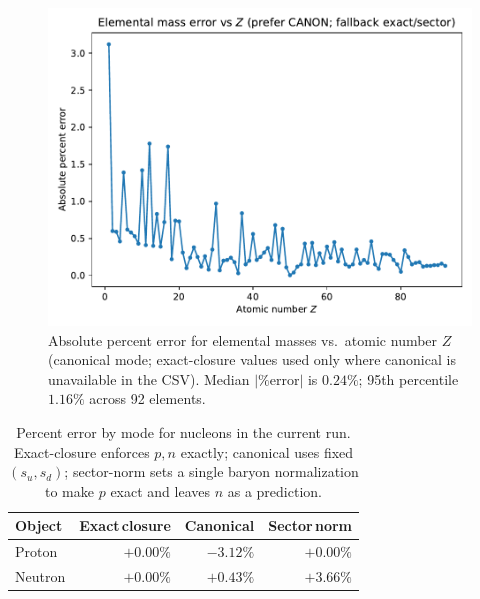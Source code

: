 \documentclass[11pt, preprint,titlepage]{revtex4-2}
\begin{document}
		\begin{figure}[t]
		\centering
		\includegraphics[width=0.75\linewidth]{elements_error_by_Z_canonical.pdf}
		\caption{Absolute percent error for elemental masses vs.\ atomic number \(Z\) (canonical mode; exact-closure values used only where canonical is unavailable in the CSV). Median \(|\%\text{error}|\) is \(0.24\%\); 95th percentile \(1.16\%\) across 92 elements.}
		\label{fig:elements_error_by_Z}
		\end{figure}

		\begin{table}[t]
		\centering
		\begin{tabular}{lrrr}
		\toprule
		\textbf{Object} & \textbf{Exact\,closure} & \textbf{Canonical} & \textbf{Sector\,norm} \\
		\midrule
		Proton  & \(+0.00\%\) & \(-3.12\%\) & \(+0.00\%\) \\
		Neutron & \(+0.00\%\) & \(+0.43\%\) & \(+3.66\%\) \\
		\bottomrule
		\end{tabular}
		\caption{Percent error by mode for nucleons in the current run. Exact-closure enforces \(p,n\) exactly; canonical uses fixed \((s_u,s_d)\); sector-norm sets a single baryon normalization to make \(p\) exact and leaves \(n\) as a prediction.}
		\label{tab:pn_modes}
		\end{table}
\end{document}
